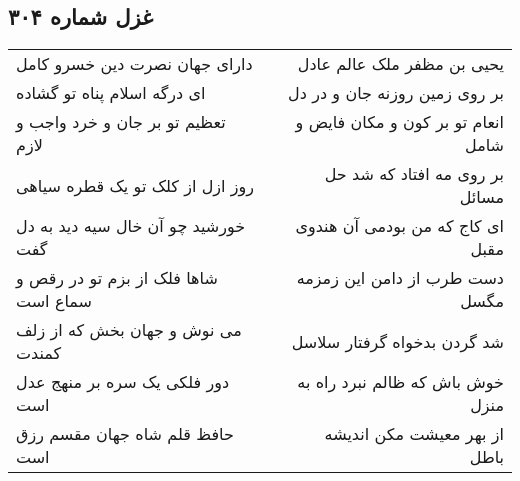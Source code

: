 \begin{center}
\section*{غزل شماره ۳۰۴}
\label{sec:sh304}
\begin{longtable}{l p{0.5cm} r}
دارای جهان نصرت دین خسرو کامل
&&
یحیی بن مظفر ملک عالم عادل
\\
ای درگه اسلام پناه تو گشاده
&&
بر روی زمین روزنه جان و در دل
\\
تعظیم تو بر جان و خرد واجب و لازم
&&
انعام تو بر کون و مکان فایض و شامل
\\
روز ازل از کلک تو یک قطره سیاهی
&&
بر روی مه افتاد که شد حل مسائل
\\
خورشید چو آن خال سیه دید به دل گفت
&&
ای کاج که من بودمی آن هندوی مقبل
\\
شاها فلک از بزم تو در رقص و سماع است
&&
دست طرب از دامن این زمزمه مگسل
\\
می نوش و جهان بخش که از زلف کمندت
&&
شد گردن بدخواه گرفتار سلاسل
\\
دور فلکی یک سره بر منهج عدل است
&&
خوش باش که ظالم نبرد راه به منزل
\\
حافظ قلم شاه جهان مقسم رزق است
&&
از بهر معیشت مکن اندیشه باطل
\\
\end{longtable}
\end{center}
